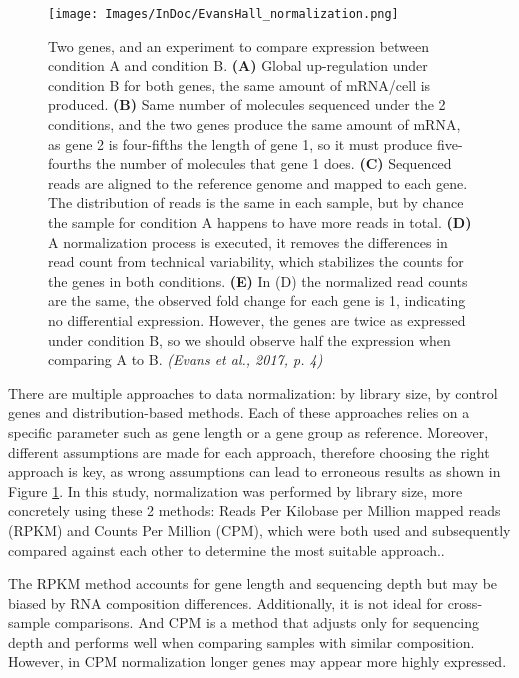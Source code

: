 \documentclass[
]{article}
\begin{document}
\begin{figure}[H]
  \centering
  \texttt{[image: Images/InDoc/EvansHall\_normalization.png]}
  \caption[Normalization assumptions]{\small 
  	Two genes, and an experiment to compare expression between
	condition A and condition B. \textbf{(A)} Global up-regulation under
	condition B for both genes, the same amount of mRNA/cell is produced.
	\textbf{(B)} Same number of molecules sequenced under the 2 conditions,
	and the two genes produce the same amount of mRNA, as gene 2 is
	four-fifths the length of gene 1, so it must produce five-fourths the
	number of molecules that gene 1 does. \textbf{(C)} Sequenced reads are
	aligned to the reference genome and mapped to each gene. The
	distribution of reads is the same in each sample, but by chance the
	sample for condition A happens to have more reads in total. \textbf{(D)}
	A normalization process is executed, it removes the differences in read
	count from technical variability, which stabilizes the counts for the
	genes in both conditions. \textbf{(E)} In (D) the normalized read counts
	are the same, the observed fold change for each gene is 1, indicating no
	differential expression. However, the genes are twice as expressed under
	condition B, so we should observe half the expression when comparing A
	to B. \textit{(Evans et al., 2017, p. 4)}
  } %
    \label{fig:norm_ass}
\end{figure}

There are multiple approaches to data normalization: by library size, by
control genes and distribution-based methods. Each of these approaches
relies on a specific parameter such as gene length or a gene group as
reference. Moreover, different assumptions are made for each approach,
therefore choosing the right approach is key, as wrong assumptions can
lead to erroneous results as shown in Figure \ref{fig:norm_ass}. In this study,
normalization was performed by library size, more concretely using these
2 methods: Reads Per Kilobase per Million mapped reads (RPKM) and Counts
Per Million (CPM), which were both used and subsequently compared
against each other to determine the most suitable approach..

The RPKM method accounts for gene length and sequencing depth but may be
biased by RNA composition differences. Additionally, it is not ideal for
cross-sample comparisons. And CPM is a method that adjusts only for
sequencing depth and performs well when comparing samples with similar
composition. However, in CPM normalization longer genes may appear more
highly expressed.
\end{document}
